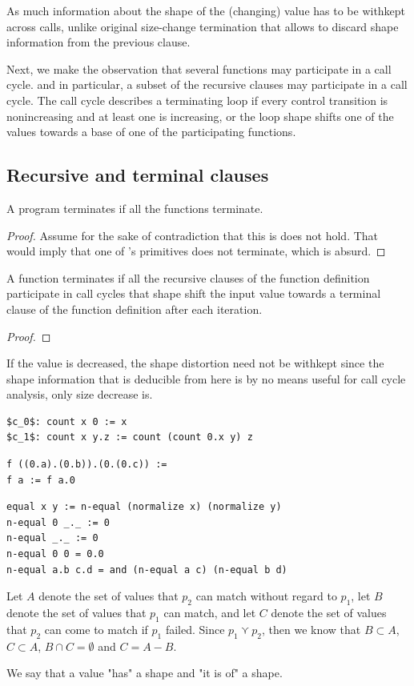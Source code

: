 As much information about the shape of the (changing) value has to be withkept
across calls, unlike original size-change termination that allows to discard
shape information from the previous clause.

Next, we make the observation that several functions may participate in a call
cycle.  and in particular, a subset of the recursive clauses may participate in
a call cycle. The call cycle describes a terminating loop if every control
transition is nonincreasing and at least one is increasing, or the loop shape
shifts one of the values towards a base of one of the participating functions.

\subsection{Recursive and terminal clauses}

\begin{lemma}
A program terminates if all the functions terminate.
\end{lemma}

\begin{proof} Assume for the sake of contradiction that this is does not hold.
That would imply that one of \D{}'s primitives does not terminate, which is
absurd.  \end{proof}

\begin{lemma} A function terminates if all the recursive clauses of the
function definition participate in call cycles that shape shift the input value
towards a terminal clause of the function definition after each iteration.
\end{lemma}

\begin{proof}

\end{proof}


If the value is decreased, the shape distortion need not be withkept since the
shape information that is deducible from here is by no means useful for call
cycle analysis, only size decrease is.

\begin{lstlisting}
$c_0$: count x 0 := x
$c_1$: count x y.z := count (count 0.x y) z
\end{lstlisting}

\begin{lstlisting}
f ((0.a).(0.b)).(0.(0.c)) := 
f a := f a.0
\end{lstlisting}

\begin{verbatim}
equal x y := n-equal (normalize x) (normalize y)
n-equal 0 _._ := 0
n-equal _._ := 0
n-equal 0 0 = 0.0
n-equal a.b c.d = and (n-equal a c) (n-equal b d)
\end{verbatim}

Let $A$ denote the set of values that $p_2$ can
match without regard to $p_1$, let $B$ denote the set of values that $p_1$ can
match, and let $C$ denote the set of values that $p_2$ can come to match if
$p_1$ failed. Since $p_1\curlyvee p_2$, then we know that $B\subset A$,
$C\subset A$, $B\cap C=\emptyset$ and $C=A-B$.



We say that a value "has" a shape and "it is of" a shape.
